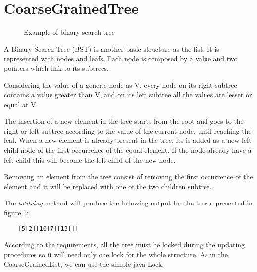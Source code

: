 \section{CoarseGrainedTree}
\label{coarsegrainedtree}


\begin{figure}[H]
	\centering
	\caption{Example of binary search tree}
	\label{fig:tree}
\end{figure}

A Binary Search Tree (BST) is another basic structure as the list. It is represented with nodes and leafs. Each node is composed by a value and two pointers which link to its subtrees.


Considering the value of a generic node as V, every node on its right subtree contains a value greater than V, and on its left subtree all the values are lesser or equal at V. \newline


The insertion of a new element in the tree starts from the root and goes to the right or left subtree according to the value of the current node, until reaching the leaf. When a new element is already present in the tree, its is added as a new left child node of the first occurrence of the equal element. If the node already have a left child this will become the left child of the new node.


Removing an element from the tree consist of removing the first occurrence of the element and it will be replaced with one of the two children subtree.\newline


The \emph{toString} method will produce the following output for the tree represented in figure \ref{fig:tree}:\newline

\begin{lstlisting}
	[5[2][10[7][13]]]
\end{lstlisting}

According to the requirements, all the tree must be locked during the updating procedures so it will need only one lock for the whole structure. As in the CoarseGrainedList, we can use the simple java Lock.


